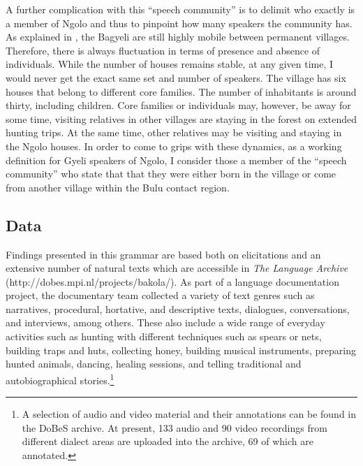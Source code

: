 A further complication with this ``speech community'' is to delimit who exactly is a member of Ngolo and thus to pinpoint how many speakers the community has. As explained in , the Bagyeli are still highly mobile between permanent villages. Therefore, there is always fluctuation in terms of presence and absence of individuals. While the number of houses remains stable, at any given time, I would never get the exact same set and number of speakers. The village has six houses that belong to different core families. The number of inhabitants is around thirty, including children. Core families or individuals may, however, be away for some time, visiting relatives in other villages are staying in the forest on extended hunting trips. At the same time, other relatives may be visiting and staying in the Ngolo houses.  
In order to come to grips with these dynamics,  as a working definition for Gyeli speakers of Ngolo, I consider those a member of the ``speech community'' who state that that they were either born in the village or come from another village within the Bulu contact region. 



\subsection{Data}
\label{sec:Data}

Findings presented in this grammar are based both on elicitations and an extensive number of natural texts which are accessible in {\itshape The Language Archive} (http://dobes.mpi.nl/projects/bakola/). As part of a language documentation project, the documentary team collected a variety of text genres such as narratives, procedural, hortative, and descriptive texts, dialogues, conversations, and interviews, among others. These also include a wide range of everyday activities such as hunting with different techniques such as spears or nets, building traps and huts, collecting honey, building musical instruments, preparing hunted animals, dancing, healing sessions, and telling traditional and autobiographical stories.\footnote{A selection of audio and video material and their annotations can be found in the DoBeS archive. At present, 133 audio and 90 video recordings from different dialect areas are uploaded into the archive, 69 of which are annotated.}

